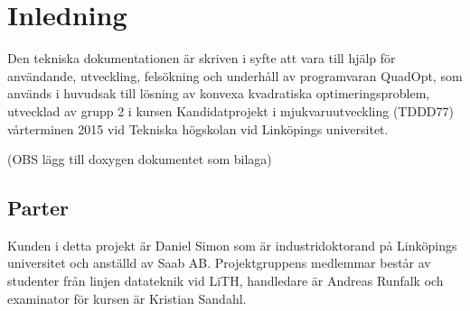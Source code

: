 \section{Inledning}
Den tekniska dokumentationen är skriven i syfte att vara till hjälp för användande, utveckling, felsökning och underhåll av programvaran QuadOpt, som används i huvudsak till lösning av konvexa kvadratiska optimeringsproblem, utvecklad av grupp 2 i kursen Kandidatprojekt i mjukvaruutveckling (TDDD77) vårterminen 2015 vid Tekniska högskolan vid Linköpings universitet.

(OBS lägg till doxygen dokumentet som bilaga)

\subsection{Parter}
Kunden i detta projekt är Daniel Simon som är industridoktorand på Linköpings universitet och anställd av Saab AB. Projektgruppens medlemmar består av studenter från linjen datateknik vid LiTH, handledare är Andreas Runfalk och examinator för kursen är Kristian Sandahl.





